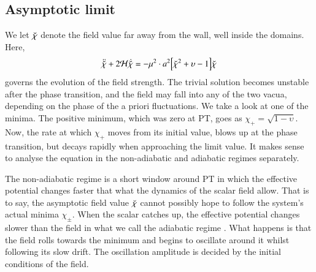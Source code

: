



\subsection{Asymptotic limit}\label{sec:PT:symm_dws:asymptotic}
    We let $\breve{\chi}$ denote the field value far away from the wall, well inside the domains. Here,
    \begin{equation}\label{eq:PT:symm_dws:eom_asym_chi_s}
        \ddot{\breve{\chi}} +  2\mathcal{H} \dot{\breve{\chi}} = - \mu^2 \cdot a^2{\left[  \breve{\chi}^2 + \upsilon - 1  \right]}\breve{\chi}
    \end{equation}
    governs the evolution of the field strength. The trivial solution becomes unstable after the phase transition, and the field may fall into any of the two vacua, depending on the phase of the a priori fluctuations. We take a look at one of the minima. The positive minimum, which was zero at PT, goes as $\chi_+ = \sqrt{1-\upsilon}$. Now, the rate at which $\chi_+$ moves from its initial value, blows up at the phase transition, but decays rapidly when approaching the limit value. %
    It makes sense to analyse the equation in the  non-adiabatic and  adiabatic regimes separately.

    The non-adiabatic regime  is a short window around PT in which the effective potential changes faster that what the dynamics of the scalar field allow. That is to say, the asymptotic field value $\breve{\chi}$ cannot possibly hope to follow the system's actual minima $\chi_\pm$. When the scalar catches up, the effective potential changes slower than the field in what we call the  adiabatic regime . What happens is that the field rolls towards the minimum and begins to oscillate around it whilst following its slow drift. The oscillation amplitude is decided by the initial conditions of the field.


